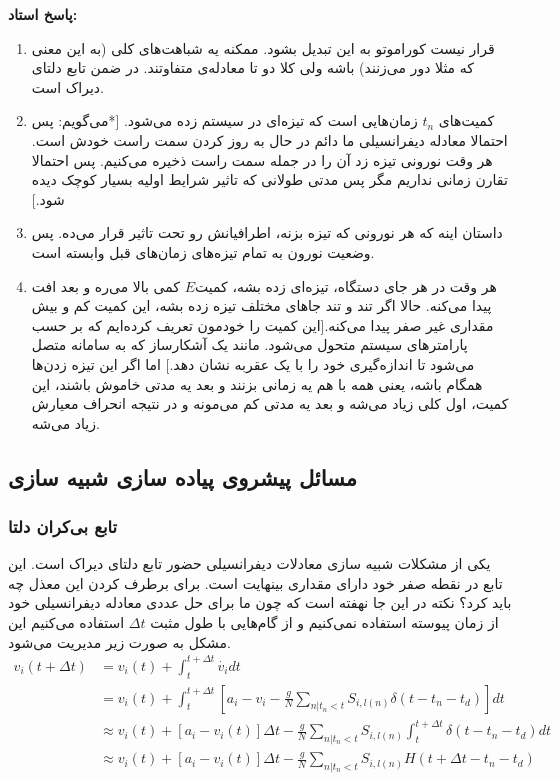 \documentclass[12pt,onecolumn,a4paper]{article}
\begin{document}
\textbf{پاسخ استاد:}
\begin{enumerate}
\item
قرار نیست کوراموتو به این تبدیل بشود. ممکنه یه شباهت‌های کلی‌ (به این معنی که مثلا دور می‌زنند) باشه ولی کلا دو تا معادله‌ی متفاوتند. در ضمن تابع دلتای دیراک است.
\item
کمیت‌های $t_n$ زمان‌هایی است که تیزه‌ای در سیستم زده می‌شود. [*می‌گویم: پس احتمالا معادله دیفرانسیلی ما دائم در حال به روز کردن سمت راست خودش است. هر وقت نورونی تیزه زد آن را در جمله سمت راست ذخیره می‌کنیم. پس احتمالا تقارن زمانی نداریم مگر پس مدتی طولانی که تاثیر شرایط اولیه بسیار کوچک دیده شود.]
\item
داستان اینه که هر نورونی که تیزه بزنه، اطرافیانش رو تحت تاثیر قرار می‌ده. پس وضعیت نورون به تمام تیزه‌های زمان‌های قبل وابسته است.
\item
هر وقت در هر جای دستگاه، تیزه‌ای زده بشه، کمیت$E$ کمی بالا می‌ره و بعد افت پیدا می‌کنه. حالا اگر تند و تند جا‌های مختلف تیزه زده بشه، این کمیت کم و بیش مقداری غیر صفر پیدا می‌کنه.[این کمیت را خودمون تعریف کرده‌ایم که بر حسب پارامترهای سیستم متحول می‌شود. مانند یک آشکارساز که به سامانه متصل می‌شود تا اندازه‌گیری خود را با یک عقربه نشان دهد.] اما اگر این تیزه زدن‌ها همگام باشه، یعنی همه با هم یه زمانی بزنند و بعد یه مدتی خاموش باشند، این کمیت، اول کلی زیاد می‌شه و بعد یه مدتی کم می‌مونه و در نتیجه انحراف معیارش زیاد می‌شه.
\end{enumerate}

\subsection{مسائل پیشروی پیاده سازی شبیه سازی}
\subsubsection{تابع بی‌کران دلتا}
یکی از مشکلات شبیه سازی معادلات دیفرانسیلی حضور تابع دلتای دیراک است. این تابع در نقطه صفر خود دارای مقداری بینهایت است. برای برطرف کردن این معذل چه باید کرد؟ نکته در این جا نهفته است که چون ما برای حل عددی معادله دیفرانسیلی خود از زمان پیوسته استفاده نمی‌کنیم و از گام‌هایی با طول مثبت $\Delta t$ استفاده می‌کنیم این مشکل به صورت زیر مدیریت می‌شود.
\begin{align}
v_{i}(t+\Delta t) &= v_{i}(t) + \int_{t}^{t+\Delta t} \dot{v_i}  dt \\
&= v_{i}(t) + \int_{t}^{t+\Delta t} \left[ a_i - v_i - \frac{g}{N} \sum_{n|t_n<t} S_{i,l(n)} \delta(t - t_n - t_d)  \right]   dt \\
&\approx v_{i}(t) +  \left[ a_i - v_i(t) \right] \Delta t - \frac{g}{N} \sum_{n|t_n<t} S_{i,l(n)} \int_{t}^{t+\Delta t} \delta(t - t_n - t_d) dt  \\
&\approx v_{i}(t) +  \left[ a_i - v_i(t) \right] \Delta t - \frac{g}{N} \sum_{n|t_n<t} S_{i,l(n)} H(t + \Delta t- t_n - t_d) \label{eq:potential_changes}
\end{align}
\end{document}

